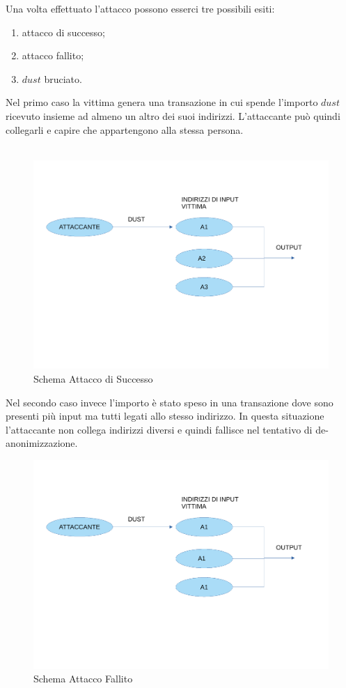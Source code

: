 \FloatBarrier
Una volta effettuato l'attacco possono esserci tre possibili esiti: 
    \begin{enumerate}
        \item attacco di successo;
        \item attacco fallito;
        \item $dust$ bruciato.
    \end{enumerate}
Nel primo caso la vittima genera una transazione in cui spende l'importo $dust$ ricevuto insieme ad almeno un altro dei suoi indirizzi. L'attaccante può quindi collegarli e capire che appartengono alla stessa persona.\\\\
\begin{figure}[h!]
    \centering
    \includegraphics[scale=0.4]{Images/successo.pdf}
    \caption{Schema Attacco di Successo}
    \label{fig:success}
\end{figure}
\FloatBarrier
Nel secondo caso invece l'importo è stato speso in una transazione dove sono presenti più input ma tutti legati allo stesso indirizzo. In questa situazione l'attaccante non collega indirizzi diversi e quindi fallisce nel tentativo di de-anonimizzazione. 
\begin{figure}[h!]
    \centering
    \includegraphics[scale=0.35]{Images/fallimento.pdf}
    \caption{Schema Attacco Fallito}
    \label{fig:Dust_attack}
\end{figure}
